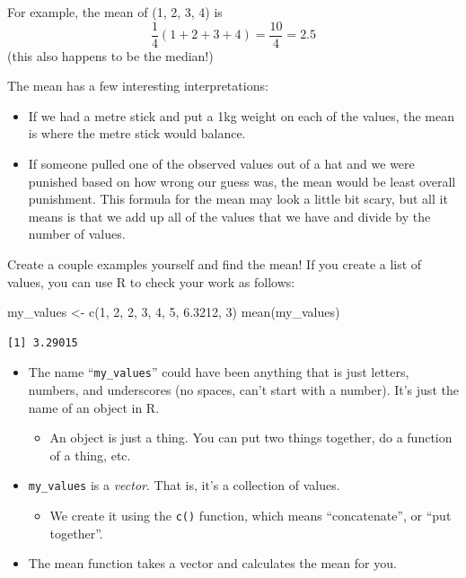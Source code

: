 \documentclass[
  letterpaper,
  DIV=11,
  numbers=noendperiod,
  oneside]{scrreprt}
\newenvironment{Shaded}{\begin{snugshade}}{\end{snugshade}}
\newcommand{\DecValTok}[1]{\textcolor[rgb]{0.68,0.00,0.00}{#1}}
\newcommand{\FloatTok}[1]{\textcolor[rgb]{0.68,0.00,0.00}{#1}}
\newcommand{\FunctionTok}[1]{\textcolor[rgb]{0.28,0.35,0.67}{#1}}
\newcommand{\NormalTok}[1]{\textcolor[rgb]{0.00,0.23,0.31}{#1}}
\newcommand{\OtherTok}[1]{\textcolor[rgb]{0.00,0.23,0.31}{#1}}
\providecommand{\tightlist}{%
  \setlength{\itemsep}{0pt}\setlength{\parskip}{0pt}}\usepackage{longtable,booktabs,array}
\begin{document}
For example, the mean of (1, 2, 3, 4) is \[
\frac{1}{4}(1 + 2 + 3 + 4) = \frac{10}{4} = 2.5
\] (this also happens to be the median!)

The mean has a few interesting interpretations:

\begin{itemize}
\tightlist
\item
  If we had a metre stick and put a 1kg weight on each of the values,
  the mean is where the metre stick would balance.
\item
  If someone pulled one of the observed values out of a hat and we were
  punished based on how wrong our guess was, the mean would be least
  overall punishment. This formula for the mean may look a little bit
  scary, but all it means is that we add up all of the values that we
  have and divide by the number of values.
\end{itemize}

Create a couple examples yourself and find the mean! If you create a
list of values, you can use R to check your work as follows:

\begin{Shaded}
\begin{Highlighting}[]
\NormalTok{my\_values }\OtherTok{\textless{}{-}} \FunctionTok{c}\NormalTok{(}\DecValTok{1}\NormalTok{, }\DecValTok{2}\NormalTok{, }\DecValTok{2}\NormalTok{, }\DecValTok{3}\NormalTok{, }\DecValTok{4}\NormalTok{, }\DecValTok{5}\NormalTok{, }\FloatTok{6.3212}\NormalTok{, }\DecValTok{3}\NormalTok{)}
\FunctionTok{mean}\NormalTok{(my\_values)}
\end{Highlighting}
\end{Shaded}

\begin{verbatim}
[1] 3.29015
\end{verbatim}

\begin{itemize}
\tightlist
\item
  The name ``\texttt{my\_values}'' could have been anything that is just
  letters, numbers, and underscores (no spaces, can't start with a
  number). It's just the name of an object in R.

  \begin{itemize}
  \tightlist
  \item
    An object is just a thing. You can put two things together, do a
    function of a thing, etc.
  \end{itemize}
\item
  \texttt{my\_values} is a \emph{vector}. That is, it's a collection of
  values.

  \begin{itemize}
  \tightlist
  \item
    We create it using the \texttt{c()} function, which means
    ``concatenate'', or ``put together''.
  \end{itemize}
\item
  The mean function takes a vector and calculates the mean for you.
\end{itemize}
\end{document}
